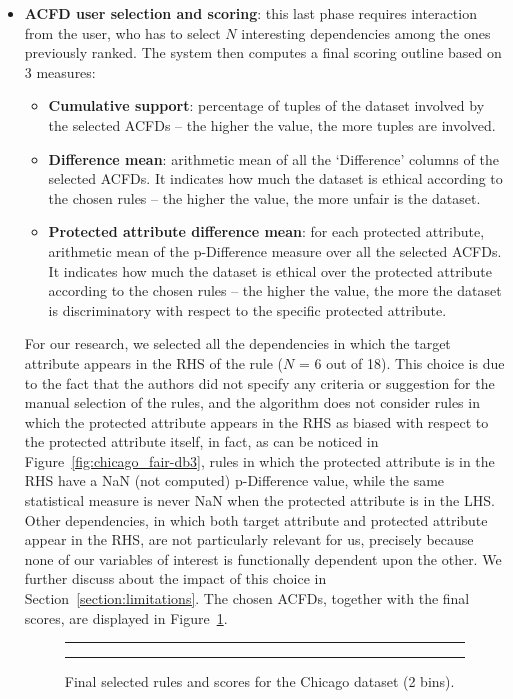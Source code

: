 \begin{itemize}
\item \textbf{ACFD user selection and scoring}: this last phase requires interaction from the user, who has to select \(N\) interesting dependencies among the ones previously ranked. The system then computes a final scoring outline based on 3 measures:
\begin{itemize}
\item \textbf{Cumulative support}: percentage of tuples of the dataset involved by the selected ACFDs -- the higher the value, the more tuples are involved.
\item \textbf{Difference mean}: arithmetic mean of all the `Difference' columns of the selected ACFDs. It indicates how much the dataset is ethical according to the chosen rules -- the higher the value, the more unfair is the dataset.
\item \textbf{Protected attribute difference mean}: for each protected attribute, arithmetic mean of the p-Difference measure over all the selected ACFDs. It indicates how much the dataset is ethical over the protected attribute according to the chosen rules -- the higher the value, the more the dataset is discriminatory with respect to the specific protected attribute.
\end{itemize}

For our research, we selected all the dependencies in which the target attribute appears in the RHS of the rule (\(N\) = 6 out of 18). This choice is due to the fact that the authors did not specify any criteria or suggestion for the manual selection of the rules, and the algorithm does not consider rules in which the protected attribute appears in the RHS as biased with respect to the protected attribute itself, in fact, as can be noticed in Figure~\ref{fig:chicago_fair-db3}, rules in which the protected attribute is in the RHS have a NaN (not computed) p-Difference value, while the same statistical measure is never NaN when the protected attribute is in the LHS. Other dependencies, in which both target attribute and protected attribute appear in the RHS, are not particularly relevant for us, precisely because none of our variables of interest is functionally dependent upon the other. We further discuss about the impact of this choice in Section~\ref{section:limitations}. The chosen ACFDs, together with the final scores, are displayed in Figure~\ref{fig:chicago_fair-db4}.

\begin{figure}[t!]
\centering
\noindent\rule{\linewidth}{0.4pt}\par
\noindent\rule{\linewidth}{0.4pt}
\caption{Final selected rules and scores for the Chicago dataset (2 bins).}
\label{fig:chicago_fair-db4}
\end{figure}
\end{itemize}

